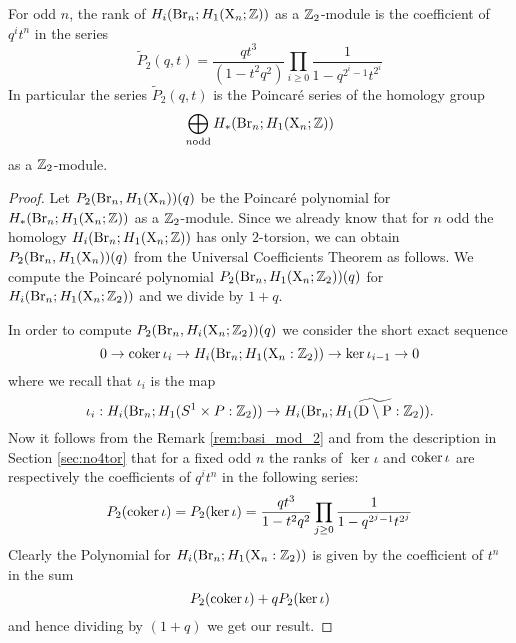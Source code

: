 
\begin{thm}\label{thm:poincare}
For odd $n$, 
the rank of $H_i(\operatorname{Br}_n;H_1(\mathrm{X}_n;\mathbb{Z}))$ as a $\mathbb{Z}_2$-module is the coefficient of $q^it^n$ in the series
 $$
\widetilde{P}_2(q,t)=\frac{qt^3}{(1-t^2q^2)} \prod_{i \geq 0} \frac{1}{1-q^{2^i-1}t^{2^i}}
$$
In particular the series $\widetilde{P}_2(q,t)$ is 
the Poincar\'e series of the homology group  %
$$\bigoplus_{n \mbox{\scriptsize odd}}H_*(\operatorname{Br}_{n};H_1(\mathrm{X}_n;\mathbb{Z}))$$
as a $\mathbb{Z}_2$-module. 
\end{thm}

\begin{proof}
Let $P_2(\operatorname{Br}_n,H_1(\mathrm{X}_n))(q)$ be the Poincar\'e polynomial for $H_*(\operatorname{Br}_n;H_1(\mathrm{X}_n;\mathbb{Z}))$ as a $\mathbb{Z}_2$-module. 
Since we already know that for $n$ odd the homology $H_i(\operatorname{Br}_n;H_1(\mathrm{X}_n;\mathbb{Z}))$ has only $2$-torsion, we can obtain $P_2(\operatorname{Br}_n,H_1(\mathrm{X}_n))(q)$ from the Universal Coefficients Theorem as follows. We compute the Poincar\'e polynomial 
$
P_2(\operatorname{Br}_n, H_1(\mathrm{X}_n;\mathbb{Z}_2))(q)
$
for
$H_i(\operatorname{Br}_n;H_1(\mathrm{X}_n;\mathbb{Z}_2))
$
and we divide by $1+q$.

In order to compute $
P_2(\operatorname{Br}_n, H_i(\mathrm{X}_n;\mathbb{Z}_2))(q)
$ 
we consider the short exact sequence
$$
0 \to \operatorname{\mathrm{coker}} \iota_i \to H_{i}(\operatorname{Br}_n; H_1(\mathrm{X}_n:\mathbb{Z}_2)) \to \ker \iota_{i-1} \to 0
$$
where we recall that $\iota_i$ is the map
$$\iota_i:H_{i}(\operatorname{Br}_n; H_1(S^1 \times P:\mathbb{Z}_2)) \to H_{i}(\operatorname{Br}_n; H_1(\widetilde{\mathrm{D} \setminus \mathrm{P}}:\mathbb{Z}_2)).$$
Now it follows from the Remark \ref{rem:basi_mod_2} and from the description in Section \ref{sec:no4tor} that for a fixed odd $n$ the ranks of $\ker \iota$ and $\operatorname{\mathrm{coker}} \iota$
are respectively the coefficients of $q^it^n$ in the following series:
$$
P_2(\operatorname{\mathrm{coker}} \iota) = P_2(\ker \iota)  =
\frac{qt^3}{1-t^2q^2} \prod_{j \geq 0} \frac{1}{1-q^{2^j-1}t^{2^j}}
$$
Clearly the Polynomial for 
$H_{i}(\operatorname{Br}_n; H_1(\mathrm{X}_n:\mathbb{Z}_2))$ is given by the coefficient of $t^n$ in the sum
$$
 P_2(\operatorname{\mathrm{coker}} \iota) + qP_2(\ker \iota) 
$$
and hence dividing by $(1+q)$ we get our result. 
\end{proof}

